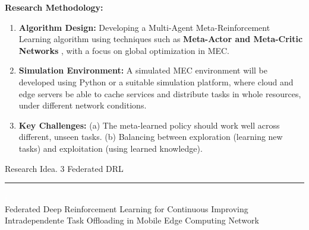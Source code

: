 \documentclass[12pt]{article}
\begin{document}
\vspace{5mm}

\noindent\textbf{\large Research Methodology:}

\begin{enumerate}  \item \textbf{Algorithm Design:} Developing a Multi-Agent Meta-Reinforcement Learning algorithm using techniques such as \textbf{Meta-Actor and Meta-Critic Networks} \cite{ding2023multiagent}, with a focus on global optimization in MEC.\vspace{-1mm}
	
	\item \textbf{Simulation Environment:} A simulated MEC environment will be developed using Python or a suitable simulation platform, where cloud and edge servers be able to cache services and distribute tasks in whole resources, under different network conditions. 
	
	\item \textbf{Key Challenges:}  (a) The meta-learned policy should work well across different, unseen tasks. (b) Balancing between exploration (learning new tasks) and exploitation (using learned knowledge). 
\end{enumerate}


\newpage



\begin{center} 
	
	
	\vspace{-17mm}
	
	\large Research Idea. 3  \hfill Federated DRL \vspace{1mm} \hrule
	
	\vspace{-1mm}
	
	
	
	
	\textcolor{white}{i} \\ \LARGE Federated Deep Reinforcement Learning for Continuous Improving Intradependente Task Offloading in Mobile Edge Computing Network\vspace{6mm}\\
	
\end{center}
\vspace{-5mm}
\end{document}
